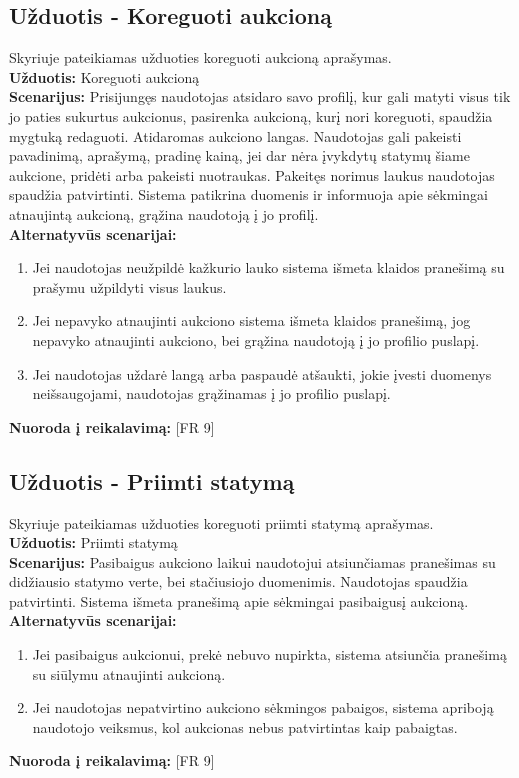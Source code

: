 \documentclass{VUMIFPSkursinis}
\begin{document}
	\subsection{Užduotis - Koreguoti aukcioną}
	Skyriuje pateikiamas užduoties koreguoti aukcioną aprašymas.\\
	\textbf{Užduotis:}  Koreguoti aukcioną \\
	\textbf{Scenarijus:}  Prisijungęs naudotojas atsidaro savo profilį, kur gali matyti visus tik jo paties sukurtus aukcionus, pasirenka aukcioną, kurį nori koreguoti, spaudžia mygtuką redaguoti. Atidaromas aukciono langas. Naudotojas gali pakeisti pavadinimą, aprašymą, pradinę kainą, jei dar nėra įvykdytų statymų šiame aukcione, pridėti arba pakeisti nuotraukas. Pakeitęs norimus laukus naudotojas spaudžia patvirtinti. Sistema patikrina duomenis ir informuoja apie sėkmingai atnaujintą aukcioną, grąžina naudotoją į jo profilį.  \\
	\textbf{Alternatyvūs scenarijai:}
	\begin{enumerate}
		\item Jei naudotojas neužpildė kažkurio lauko sistema išmeta klaidos pranešimą su prašymu užpildyti visus laukus. 
		\item Jei nepavyko atnaujinti aukciono sistema išmeta klaidos pranešimą, jog nepavyko atnaujinti aukciono, bei grąžina naudotoją į jo profilio puslapį. 
		\item Jei naudotojas uždarė langą arba paspaudė atšaukti, jokie įvesti duomenys neišsaugojami, naudotojas grąžinamas į jo profilio puslapį. 
	\end{enumerate}
	\textbf{Nuoroda į reikalavimą: } [FR 9]
	
	\subsection{Užduotis - Priimti statymą}
	Skyriuje pateikiamas užduoties koreguoti priimti statymą aprašymas.\\
	\textbf{Užduotis:}  Priimti statymą \\
	\textbf{Scenarijus:}  Pasibaigus aukciono laikui naudotojui atsiunčiamas pranešimas su didžiausio statymo verte, bei stačiusiojo duomenimis. Naudotojas spaudžia patvirtinti. Sistema išmeta pranešimą apie sėkmingai pasibaigusį aukcioną.  \\
	\textbf{Alternatyvūs scenarijai:}
	\begin{enumerate}
		\item Jei pasibaigus aukcionui, prekė nebuvo nupirkta, sistema atsiunčia pranešimą su siūlymu atnaujinti aukcioną. 
		\item Jei naudotojas nepatvirtino aukciono sėkmingos pabaigos, sistema apriboją naudotojo veiksmus, kol aukcionas nebus patvirtintas kaip pabaigtas. 
	\end{enumerate}
	\textbf{Nuoroda į reikalavimą: } [FR 9]
	
\end{document}
